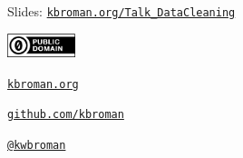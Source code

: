 \documentclass[aspectratio=169,12pt,t]{beamer}
\begin{document}
\begin{frame}[c]{}

\Large

Slides: \href{https://kbroman.org/Talk_DataCleaning}{\tt kbroman.org/Talk\_DataCleaning}

\vspace*{-7mm}
\hfill
\href{https://creativecommons.org/publicdomain/zero/1.0/}{\includegraphics[height=7mm]{Figs/cc-zero.png}}

\vspace{5mm}

\href{https://kbroman.org}{\tt \lolit kbroman.org}

\vspace{7mm}

\href{https://github.com/kbroman}{\tt \lolit github.com/kbroman}

\vspace{7mm}

\href{https://twitter.com/kwbroman}{\tt \lolit @kwbroman}

\note{
}

\end{frame}
\end{document}

